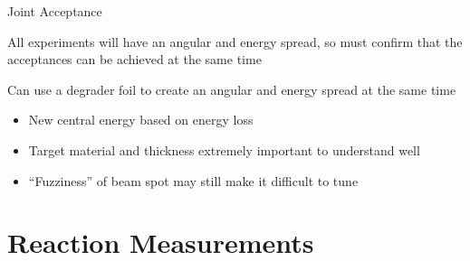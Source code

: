 \documentclass[10pt]{beamer}
\begin{document}



\begin{frame}[fragile]{Joint Acceptance}

    All experiments will have an angular and energy spread, so must
    confirm that the acceptances can be achieved at the same time

    Can use a degrader foil to create an angular and energy spread at
    the same time
    \begin{itemize}
        \item New central energy based on energy loss
        \item Target material and thickness extremely important to
            understand well
        \item ``Fuzziness'' of beam spot may still make it difficult
            to tune
    \end{itemize}

\end{frame}

\section{Reaction Measurements}
\end{document}
